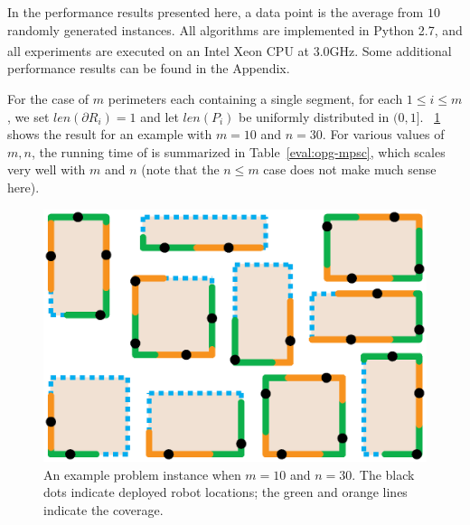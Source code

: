 In the performance results presented here, a data point is the 
average from $10$ randomly generated \opg instances. All algorithms 
are implemented in Python 2.7, and all experiments are executed on 
an Intel\textsuperscript{\textregistered} Xeon\textsuperscript{\textregistered} 
CPU at 3.0GHz. %
Some additional performance results can be found in the Appendix.

For the case of $m$ perimeters each containing a single segment, for 
each $1 \le i \le m$, we set $len(\partial R_i) = 1$ and let $len(P_i)$ 
be uniformly distributed in $(0, 1]$. ~\ref{fig:opg-mpsc-example} shows 
the result for an example with $m = 10$ and $n = 30$. For various values 
of $m, n$, the running time of \algoMRSimple is summarized in 
Table~\ref{eval:opg-mpsc}, which scales very well with $m$ and $n$ (note that 
the $n \le m$ case does not make much sense here). 

\begin{figure}[ht!]
    \vspace*{-3mm}
    \centering
    \includegraphics[keepaspectratio, scale=0.32]{./chapters/opg/figures/mpsc-example.eps}
    \vspace*{-6mm}
    \caption[An example problem instance for MPSC]{\label{fig:opg-mpsc-example} 
    An example problem instance when $m = 10$ and $n = 30$. The black dots
		indicate deployed robot locations; the green and orange lines indicate
		the coverage.
		}
    \vspace*{-2mm}
\end{figure}

